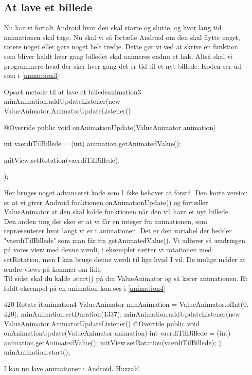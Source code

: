 \subsection{At lave et billede}
Nu har vi fortalt Android hvor den skal starte og slutte, og hvor lang tid animationen skal tage. Nu skal vi så fortælle Android om den skal flytte noget, rotere noget eller gøre noget helt tredje. Dette gør vi ved at skrive en funktion som bliver kaldt hver gang billedet skal animeres endnu et hak. Altså skal vi programmere hvad der sker hver gang det er tid til et nyt billede. Koden ser ud som i \autoref{animation3}
\begin{JavaCode}{Opsæt metode til at lave et billede}{animation3}
	minAnimation.addUpdateListener(new ValueAnimator.AnimatorUpdateListener() {
		@Override
		public void onAnimationUpdate(ValueAnimator animation) {
			int vaerdiTilBillede = (int) animation.getAnimatedValue();
			
			mitView.setRotation(vaerdiTilBillede);
		}
	});
\end{JavaCode}
Her bruges noget advanceret kode som I ikke behøver at forstå. Den korte version er at vi giver Android funktionen onAnimationUpdate() og fortæller ValueAnimator at den skal kalde funktionen når den vil have et nyt billede.\\
Den anden ting der sker er at vi får en integer fra animationen, som repræsenterer hvor langt vi er i animationen. Det er den variabel der hedder "vaerdiTilBillede" som man får fra getAnimatedValue(). Vi udfører så ændringen på vores view med denne værdi, i eksemplet sætter vi rotationen med setRotation, men I kan bruge denne værdi til lige hvad I vil. De mulige måder at ændre views på kommer om lidt.\\
Til sidst skal du kalde .start() på din ValueAnimator og så kører animationen. Et fuldt eksempel på en animation kan ses i \autoref{animation4}
\begin{JavaCode}{420 Rotate it}{animation4}
	ValueAnimator minAnimation = ValueAnimator.ofInt(0, 420);
	minAnimation.setDuration(1337);
	minAnimation.addUpdateListener(new ValueAnimator.AnimatorUpdateListener() {
		@Override
		public void onAnimationUpdate(ValueAnimator animation) {
			int vaerdiTilBillede = (int) animation.getAnimatedValue();
			mitView.setRotation(vaerdiTilBillede);
		}
	});
	minAnimation.start();
\end{JavaCode}
I kan nu lave animationer i Android. Huzzah!

